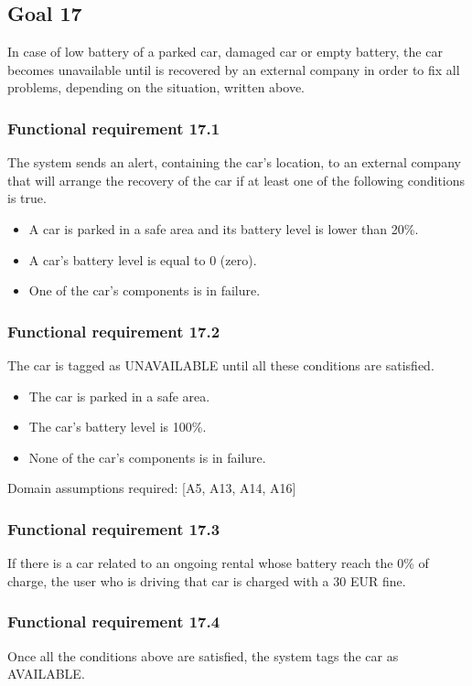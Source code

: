 \subsection{Goal 17}
In case of low battery of a parked car, damaged car or empty battery, the car becomes unavailable until is recovered by an external company in order to fix all problems, depending on the situation, written above. 

\setcounter{secnumdepth}{3}
\subsubsection{Functional requirement 17.1}
The system sends an alert, containing the car's location, to an external company that will arrange the recovery of the car if at least one of the following conditions is true.

\begin{itemize}
	\item A car is parked in a safe area and its battery level is lower than 20\%.
	\item A car's battery level is equal to 0 (zero).
	\item One of the car's components is in failure.
\end{itemize}

\subsubsection{Functional requirement 17.2}
The car is tagged as UNAVAILABLE until all these conditions are satisfied.

\begin{itemize}
	\item The car is parked in a safe area.
	\item The car's battery level is 100\%.
	\item None of the car's components is in failure.
\end{itemize}

\noindent Domain assumptions required: [A5, A13, A14, A16]

\subsubsection{Functional requirement 17.3}
If there is a car related to an ongoing rental whose battery reach the 0\% of charge, the user who is driving that car is charged with a 30 EUR fine.

\subsubsection{Functional requirement 17.4}
Once all the conditions above are satisfied, the system tags the car as AVAILABLE.
